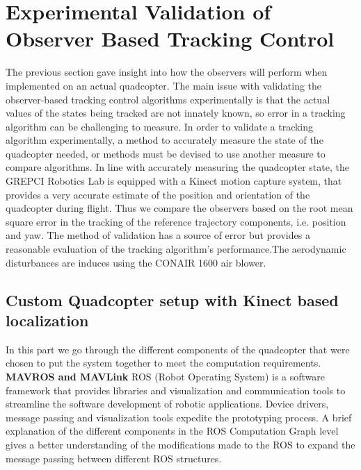 \documentclass[letterpaper%
, twoside%
, 12pt%
,memoire%
, english%
,creativecommons,hyperref%
]{thETS}
\theoremstyle{newThmStyle}
\begin{document}
\chapter{Experimental Validation of Observer Based Tracking Control} \label{Chap:ResultsPrac}
The previous section gave insight into how the observers will perform when implemented on an actual quadcopter. The main issue with validating the observer-based tracking control algorithms experimentally is that the actual values of the states being tracked are not innately known, so error in a tracking algorithm can be challenging to measure. In order to validate a tracking algorithm experimentally, a method to accurately measure the state of the quadcopter needed, or methods must be devised to use another measure to compare algorithms. In line with accurately measuring the quadcopter state, the GREPCI Robotics Lab is equipped with a Kinect motion capture system, that provides a very accurate estimate of the position and orientation of the quadcopter during flight. Thus we compare the observers based on the root mean square error in the tracking of the reference trajectory components, i.e. position and yaw. The method of validation has a source of error but provides a reasonable evaluation of the tracking algorithm's performance.The aerodynamic disturbances are induces using the CONAIR 1600 air blower.

\section{Custom Quadcopter setup with Kinect based localization}
In this part we go through the different components of the quadcopter that were chosen to put the system together to meet the computation requirements. \\
\textbf{MAVROS and MAVLink}
ROS (Robot Operating System) is a software framework that provides libraries and visualization and communication tools to streamline the software development of robotic applications. Device drivers, message passing and visualization tools expedite the prototyping process. 
A brief explanation of the different components in the ROS Computation Graph level gives a better understanding of the modifications made to the ROS to expand the message passing between different ROS structures. 
\end{document}
